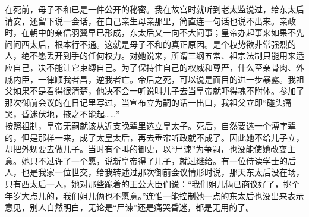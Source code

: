   在死前，母子不和已是一件公开的秘密。我在故宫时就听到老太监说过，给东太后请安，还留下说一会话，在自己亲生母亲那里，简直连一句话也说不出来。亲政时，在朝中的亲信羽翼早已形成，东太后又一向不大问事；皇帝办起事来如果不先问问西太后，根本行不通。这就是母子不和的真正原因。是个权势欲非常强烈的人，绝不愿丢开到手的任何权力。对她说来，所谓三纲五常、祖宗法制只能用来适应自己，决不能让它束缚自己。为了保持住自己的权威和尊严，什么至亲骨肉、外戚内臣，一律顺我者昌，逆我者亡。帝后之死，可以说是面目的进一步暴露。我祖父如果不是看得很清楚，他决不会一听说叫儿子去当皇帝就吓得魂不附体。参加了那次御前会议的在日记里写过，当宣布立为嗣的话一出口，我祖父立即“碰头痛哭，昏迷伏地，掖之不能起……”\\

  按照祖制，皇帝无嗣就该从近支晚辈里选立皇太子。死后，自然要选一个溥字辈的，但是那样一来，成了太皇太后，再去垂帘听政就不成了。因此她不给儿子立，却把外甥要去做儿子。当时有个叫的御史，以“尸谏”为争嗣，也没能使她改变主意。她只不过许了一个愿，说新皇帝得了儿子，就过继给。有一位侍读学士的后人，也是我家一位世交，给我转述过那次御前会议情形时说，那天东太后没在场，只有西太后一人，她对那些跪着的王公大臣们说：“我们姐儿俩已商议好了，挑个年岁大点儿的，我们姐儿俩也不愿意。”连惟一能控制她一点的东太后也没出来表示意见，别人自然明白，无论是“尸谏”还是痛哭昏迷，都是无用的了。\\

